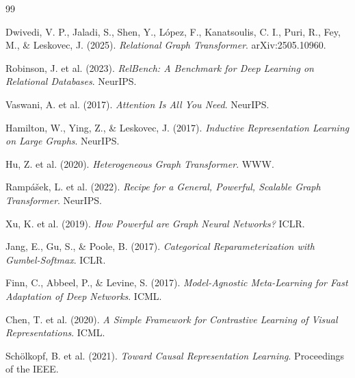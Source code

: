 \documentclass[12pt,a4paper]{article}
\begin{document}
\begin{thebibliography}{99}

Dwivedi, V. P., Jaladi, S., Shen, Y., López, F., Kanatsoulis, C. I.,
Puri, R., Fey, M., \& Leskovec, J. (2025).
\textit{Relational Graph Transformer}.
arXiv:2505.10960.

Robinson, J. et al. (2023).
\textit{RelBench: A Benchmark for Deep Learning on Relational Databases}.
NeurIPS.

Vaswani, A. et al. (2017).
\textit{Attention Is All You Need}.
NeurIPS.

Hamilton, W., Ying, Z., \& Leskovec, J. (2017).
\textit{Inductive Representation Learning on Large Graphs}.
NeurIPS.

Hu, Z. et al. (2020).
\textit{Heterogeneous Graph Transformer}.
WWW.

Rampášek, L. et al. (2022).
\textit{Recipe for a General, Powerful, Scalable Graph Transformer}.
NeurIPS.

Xu, K. et al. (2019).
\textit{How Powerful are Graph Neural Networks?}
ICLR.

Jang, E., Gu, S., \& Poole, B. (2017).
\textit{Categorical Reparameterization with Gumbel-Softmax}.
ICLR.

Finn, C., Abbeel, P., \& Levine, S. (2017).
\textit{Model-Agnostic Meta-Learning for Fast Adaptation of Deep Networks}.
ICML.

Chen, T. et al. (2020).
\textit{A Simple Framework for Contrastive Learning of Visual Representations}.
ICML.

Schölkopf, B. et al. (2021).
\textit{Toward Causal Representation Learning}.
Proceedings of the IEEE.

\end{thebibliography}
\end{document}
